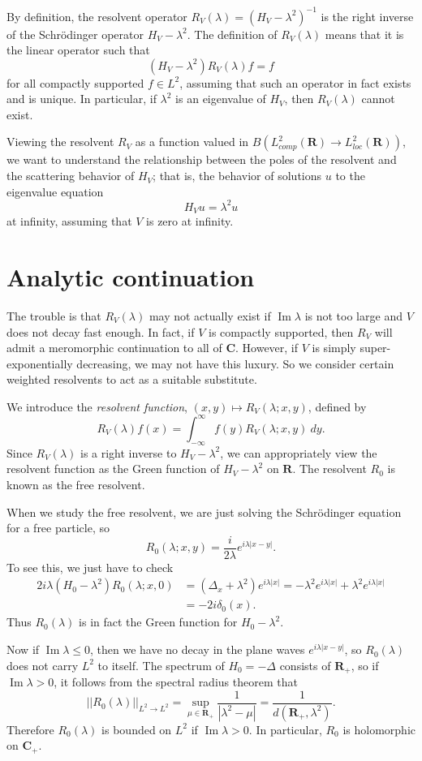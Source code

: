 \documentclass[12pt]{report}
\newcommand{\RR}{\mathbf{R}}
\newcommand{\CC}{\mathbf{C}}
\newcommand{\dfn}[1]{\emph{#1}\index{#1}}
\renewcommand{\Im}{\operatorname{Im}}
\theoremstyle{definition}
\begin{document}
By definition, the resolvent operator $R_V(\lambda) = (H_V - \lambda^2)^{-1}$ is the right inverse of the Schrödinger operator $H_V - \lambda^2$. The definition of $R_V(\lambda)$ means that it is the linear operator such that
$$(H_V - \lambda^2)R_V(\lambda) f = f$$
for all compactly supported $f \in L^2$, assuming that such an operator in fact exists and is unique.
In particular, if $\lambda^2$ is an eigenvalue of $H_V$, then $R_V(\lambda)$ cannot exist.

Viewing the resolvent $R_V$ as a function valued in $B(L^2_{comp}(\RR) \to L^2_{loc}(\RR))$, we want to understand the relationship between the poles of the resolvent and the scattering behavior of $H_V$; that is, the behavior of solutions $u$ to the eigenvalue equation
$$H_Vu = \lambda^2u$$
at infinity, assuming that $V$ is zero at infinity.

\section{Analytic continuation}
The trouble is that $R_V(\lambda)$ may not actually exist if $\Im \lambda$ is not too large and $V$ does not decay fast enough.
In fact, if $V$ is compactly supported, then $R_V$ will admit a meromorphic continuation to all of $\CC$. However, if $V$ is simply super-exponentially decreasing, we may not have this luxury. So we consider certain weighted resolvents to act as a suitable substitute.

We introduce the \dfn{resolvent function}, $(x, y) \mapsto R_V(\lambda; x, y)$, defined by
$$R_V(\lambda)f(x) = \int_{-\infty}^\infty f(y) R_V(\lambda; x, y) ~dy.$$
Since $R_V(\lambda)$ is a right inverse to $H_V - \lambda^2$, we can appropriately view the resolvent function as the Green function of $H_V - \lambda^2$ on $\RR$.
The resolvent $R_0$ is known as the free resolvent.

When we study the free resolvent, we are just solving the Schrödinger equation for a free particle, so
$$R_0(\lambda; x, y) = \frac{i}{2\lambda} e^{i\lambda|x - y|}.$$
To see this, we just have to check
\begin{align*}
2i\lambda (H_0 - \lambda^2)R_0(\lambda; x, 0) &= (\Delta_x + \lambda^2) e^{i\lambda|x|} = -\lambda^2 e^{i\lambda|x|} + \lambda^2 e^{i\lambda|x|} \\
&= -2i\delta_0(x).
\end{align*}
Thus $R_0(\lambda)$ is in fact the Green function for $H_0 - \lambda^2$.

Now if $\Im \lambda \leq 0$, then we have no decay in the plane waves $e^{i\lambda|x - y|}$, so $R_0(\lambda)$ does not carry $L^2$ to itself.
The spectrum of $H_0 = -\Delta$ consists of $\RR_+$, so if $\Im \lambda > 0$, it follows from the spectral radius theorem that
\begin{equation}
\label{bound on R_0}
  ||R_0(\lambda)||_{L^2 \to L^2} = \sup_{\mu \in \RR_+} \frac{1}{|\lambda^2 - \mu|} = \frac{1}{d(\RR_+, \lambda^2)}.
\end{equation}
Therefore $R_0(\lambda)$ is bounded on $L^2$ if $\Im \lambda > 0$. In particular, $R_0$ is holomorphic on $\CC_+$.
\end{document}
